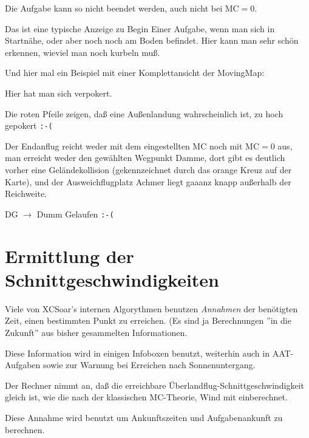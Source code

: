 \begin{description}
Die Aufgabe kann so nicht beendet werden, auch nicht bei MC$=0$.

Das ist eine typische Anzeige zu Begin Einer Aufgabe, wenn man sich in Startnähe, oder aber noch noch am Boden befindet.  
Hier kann man sehr schön erkennen, wieviel man noch kurbeln muß.
\end{description}



Und hier mal ein Beispiel mit einer Komplettansicht der MovingMap:

Hier hat man sich  verpokert. 


Die roten Pfeile zeigen, daß eine Außenlandung wahrscheinlich ist,  zu hoch gepokert \texttt{:-(}

Der Endanflug reicht weder mit dem eingestellten MC noch mit MC$=0$ aus, man erreicht weder den gewählten Wegpunkt \textsf{Damme}, dort gibt es deutlich vorher eine Geländekollision (gekennzeichnet durch das orange Kreuz auf der Karte), und der Ausweichflugplatz \textsf{Achmer} liegt gaaanz knapp außerhalb der Reichweite.

DG $\rightarrow$ Dumm Gelaufen \verb":-("


\section{Ermittlung der Schnittgeschwindigkeiten}\label{sec:task-speed-estim}

Viele von \textsf{XCSoar's} internen Algorythmen benutzen \emph{Annahmen} der benötigten Zeit,
einen bestimmten Punkt zu erreichen.
(Es sind ja Berechnungen ''in die Zukunft''  aus bisher gesammelten Informationen.

Diese Information wird in einigen Infoboxen benutzt, weiterhin auch in AAT-Aufgaben
sowie zur Warnung bei Erreichen nach Sonnenuntergang.

Der Rechner nimmt an, daß die erreichbare Überlandflug-Schnittgeschwindigkeit
gleich ist, wie die nach der klassischen MC-Theorie, Wind mit einberechnet.

Diese Annahme wird benutzt um Ankunftszeiten und Aufgabenankunft zu berechnen.

